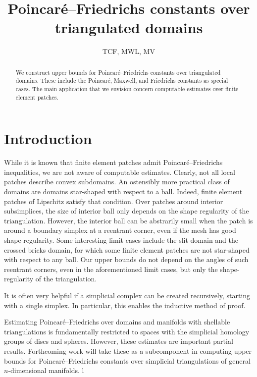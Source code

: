 \documentclass[a4paper]{article}
\title{Poincar\'e--Friedrichs constants over triangulated domains}
\author{TCF, MWL, MV}
\begin{document}
\maketitle

\begin{abstract}
    We construct upper bounds for Poincar\'e--Friedrichs constants over triangulated domains. 
    These include the Poincar\'e, Maxwell, and Friedrichs constants as special cases. 
    The main application that we envision concern computable estimates over finite element patches. 
\end{abstract}

\section{Introduction}
\cite{ern2021finite}






While it is known that finite element patches admit Poincar\'e--Friedrichs inequalities, 
we are not aware of computable estimates. 
Clearly, not all local patches describe convex subdomains. 
An ostensibly more practical class of domains are domains star-shaped with respect to a ball.
Indeed, finite element patches of Lipschitz satisfy that condition. 
Over patches around interior subsimplices, the size of interior ball only depends on the shape regularity of the triangulation. However, the interior ball can be abstrarily small when the patch is around a boundary simplex at a reentrant corner, even if the mesh has good shape-regularity. 
Some interesting limit cases include the slit domain and the crossed bricks domain,
for which some finite element patches are not star-shaped with respect to any ball. 
\color{red}Our upper bounds do not depend on the angles of such reentrant corners, even in the aforementioned limit cases, but only the shape-regularity of the triangulation. \color{black}


It is often very helpful if a simplicial complex can be created recursively, starting with a single simplex. 
In particular, this enables the inductive method of proof.


Estimating Poincar\'e--Friedrichs over domains and manifolds with shellable triangulations is fundamentally restricted to spaces with the simplicial homology groups of discs and spheres. However, these estimates are important partial results. Forthcoming work will take these as a subcomponent in computing upper bounds for Poincar\'e--Friedrichs constants over simplicial triangulations of general $n$-dimensional manifolds. l
\end{document}
